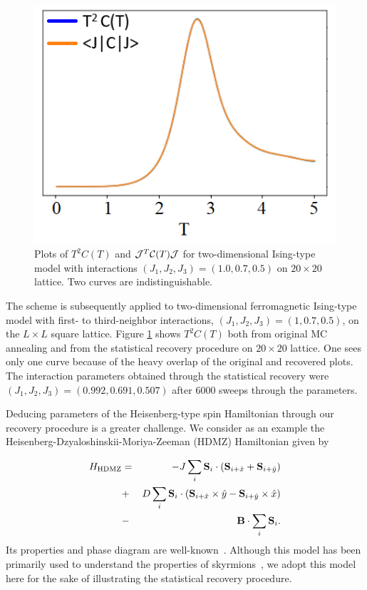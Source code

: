 \documentclass[reprint,amsmath,amssymb,aps,showpacs,superscriptaddress,prb]{revtex4-1}
\newcommand{\ba}{\begin{eqnarray}}
\newcommand{\ea}{\end{eqnarray}}
\renewcommand{\v}[1]{{\bf #1}}
\newcommand{\nn}{\nonumber \\}
\begin{document}
\begin{figure}
  \centering
\includegraphics[scale=0.5]{fig2.png}
\caption{Plots of $T^2 C(T)$ and ${\cal J}^T {\cal C}(T) {\cal J}$ for two-dimensional Ising-type model with interactions $(J_1, J_2, J_3) = (1.0, 0.7, 0.5)$ on $20\times20$ lattice.  Two curves are indistinguishable.}\label{fig:2}
\end{figure}

The scheme is subsequently applied to two-dimensional ferromagnetic Ising-type model with first- to third-neighbor interactions, $(J_1, J_2 , J_3 ) = (1, 0.7, 0.5)$, on the $L\times L$ square lattice. Figure \ref{fig:2} shows $T^2 C(T)$ both from original MC annealing and from the statistical recovery procedure on $20\times 20$ lattice. One sees only one curve because of the heavy overlap of the original and recovered plots. The interaction parameters obtained through the statistical recovery were $(J_1, J_2 , J_3 ) = (0.992, 0.691, 0.507)$ after 6000 sweeps through the parameters.

Deducing parameters of the Heisenberg-type spin Hamiltonian through our recovery procedure is a greater challenge. We consider as an example the Heisenberg-Dzyaloshinskii-Moriya-Zeeman (HDMZ) Hamiltonian given by

\ba H_{\rm HDMZ} & = & -J \sum_i \v S_i \cdot ( \v S_{i+\hat{x} } + \v S_{i+\hat{y} } ) \nn
%
& + & D \sum_i \v S_i \cdot (\v S_{i+\hat{x} } \times \hat{y} - \v S_{i+\hat{y} } \times \hat{x} ) \nn
%
& - & \v B \cdot \sum_i \v S_i . \label{eq:HDMZ} \ea
Its properties and phase diagram are well-known~\cite{han-book}. Although this model has been primarily used to understand the properties of skyrmions~\cite{han-book,nagaosa-review}, we adopt this model here for the sake of illustrating the statistical recovery procedure.
\end{document}
